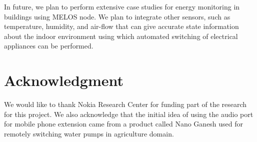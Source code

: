 \documentclass[10pt]{sigplan-proc-varsize}
\newcommand{\melos}{MELOS }
\begin{document}
In future, we plan to perform extensive case studies for energy monitoring in buildings using \melos node. We plan to integrate other sensors, such as temperature, humidity, and air-flow that can give accurate state information about the indoor environment using which automated switching of electrical appliances can be performed.

\section{Acknowledgment}
We would like to thank Nokia Research Center for funding part of the research for this project. We also acknowledge that the initial idea of using the audio port for mobile phone extension came from a product called Nano Ganesh used for remotely switching water pumps in agriculture domain.

{\small


}
\end{document}
